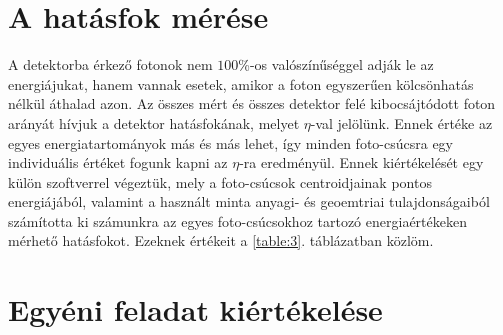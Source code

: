 \begin{multicols}{2}
\section{A hatásfok mérése}
A detektorba érkező fotonok nem $100$\%-os valószínűséggel adják le az energiájukat, hanem vannak esetek, amikor a foton egyszerűen kölcsönhatás nélkül áthalad azon. Az összes mért és összes detektor felé kibocsájtódott foton arányát hívjuk a detektor hatásfokának, melyet $\eta$-val jelölünk. Ennek értéke az egyes energiatartományok más és más lehet, így minden foto-csúcsra egy individuális értéket fogunk kapni az $\eta$-ra eredményül. \newline
Ennek kiértékelését egy külön szoftverrel végeztük, mely a foto-csúcsok centroidjainak pontos energiájából, valamint a használt minta anyagi- és geoemtriai tulajdonságaiból számította ki számunkra az egyes foto-csúcsokhoz tartozó energiaértékeken mérhető hatásfokot. Ezeknek értékeit a \ref{table:3}. táblázatban közlöm.


\section{Egyéni feladat kiértékelése}

\end{multicols}
